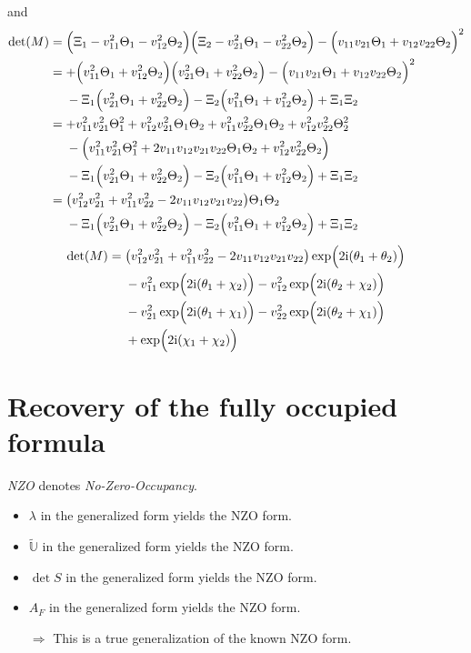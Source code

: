 \documentclass[
	english,
	a4paper,
	fontsize=10pt,
	parskip=half,
	titlepage=true,
	DIV=12,
	final
]{scrreprt}
\newcommand*{\Thus}{\ensuremath{\Rightarrow}\xspace}
\newcommand*{\iunit}{\ensuremath{\mathrm{i}}}
\begin{document}
and
\begin{align*}
	\det(M)
&=
	\qty(\Big.
		\Xi_1 - v_{11}^2 \Theta_1   -   v_{12}^2 \Theta_2
	)
	\qty(\Big.
		\Xi_2 - v_{21}^2 \Theta_1   -   v_{22}^2 \Theta_2
	)
	-
	\qty(\Big.
		v_{11} v_{21} \Theta_1 + v_{12} v_{22} \Theta_2
	)^2 \\
&=
	+ \qty(\Big.
		v_{11}^2 \Theta_1   +   v_{12}^2 \Theta_2
	)
	\qty(\Big.
		v_{21}^2 \Theta_1   +   v_{22}^2 \Theta_2
	)
	-
	\qty(\Big.
		v_{11} v_{21} \Theta_1 + v_{12} v_{22} \Theta_2
	)^2 \\
&\quad~
	- \Xi_1 \qty(\Big.
		v_{21}^2 \Theta_1   +   v_{22}^2 \Theta_2
	)
	- \Xi_2 \qty(\Big.
		v_{11}^2 \Theta_1   +   v_{12}^2 \Theta_2
	) + \Xi_1 \Xi_2 \\
&=
	+ v_{11}^2 v_{21}^2 \Theta_1^2
	+ v_{12}^2 v_{21}^2 \Theta_1 \Theta_2
	+ v_{11}^2 v_{22}^2 \Theta_1 \Theta_2
	+ v_{12}^2 v_{22}^2          \Theta_2^2
	\\
&\quad~
	- \qty( \Big.
		    v_{11}^2      v_{21}^2      \Theta_1^2
		+ 2 v_{11} v_{12} v_{21} v_{22} \Theta_1 \Theta_2
		+          v_{12}^2      v_{22}^2        \Theta_2
	) \\
&\quad~
	- \Xi_1 \qty(\Big.
		v_{21}^2 \Theta_1   +   v_{22}^2 \Theta_2
	)
	- \Xi_2 \qty(\Big.
		v_{11}^2 \Theta_1   +   v_{12}^2 \Theta_2
	) + \Xi_1 \Xi_2 \\
&=
	\qty(
		v_{12}^2 v_{21}^2 + v_{11}^2 v_{22}^2
		-
		2 v_{11} v_{12} v_{21} v_{22}
	) \Theta_1 \Theta_2 \\
&\quad~
	- \Xi_1 \qty(\Big.
		v_{21}^2 \Theta_1   +   v_{22}^2 \Theta_2
	)
	- \Xi_2 \qty(\Big.
		v_{11}^2 \Theta_1   +   v_{12}^2 \Theta_2
	) + \Xi_1 \Xi_2
\end{align*}
\begin{align}
\nonumber
	\det(M)
&=
	\qty(
		v_{12}^2 v_{21}^2 + v_{11}^2 v_{22}^2
		-
		2 v_{11} v_{12} v_{21} v_{22}
	) \exp(\Big. 2\iunit (\theta_1 + \theta_2)) \\
&\quad~
\nonumber
	- v_{11}^2 \exp(\Big. 2\iunit (\theta_1 + \chi_2))
	- v_{12}^2 \exp(\Big. 2\iunit (\theta_2 + \chi_2)) \\
&\quad~
\nonumber
	- v_{21}^2 \exp(\Big. 2\iunit (\theta_1 + \chi_1))
	- v_{22}^2 \exp(\Big. 2\iunit (\theta_2 + \chi_1)) \\
&\quad~
	+ \exp(\Big. 2\iunit (\chi_1 + \chi_2))
\end{align}

\section{Recovery of the fully occupied formula}
\emph{NZO} denotes \emph{No-Zero-Occupancy}.
\begin{itemize}
\item $\lambda$ in the generalized form yields the NZO form.
\item $\tilde{\mathbb{U}}$ in the generalized form yields the NZO form.
\item $\det S$ in the generalized form yields the NZO form.
\item $A_F$ in the generalized form yields the NZO form.
\item[\Thus] This is a true generalization of the known NZO form.
\end{itemize}
\end{document}
